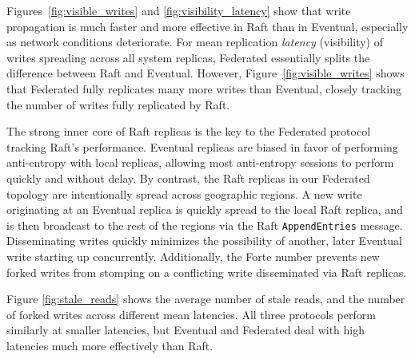 \documentclass[10pt,conference,letterpaper]{IEEEtran}
\newcommand{\todo}[1]{{\textcolor{red}{#1}}}
\newcommand{\pjk}[1]{[\todo{PJK: #1}]}
\begin{document}

Figures~\ref{fig:visible_writes} and \ref{fig:visibility_latency} show that
write propagation is much faster and more effective in Raft than in Eventual,
especially as network conditions deteriorate.
For mean replication \emph{latency} (visibility) of writes spreading across
all system replicas, Federated essentially splits the difference between Raft
and Eventual.
However, Figure~\ref{fig:visible_writes} shows that Federated fully replicates
many more writes than Eventual, closely tracking the number of writes fully
replicated by Raft.

The strong inner core of Raft replicas is the key to the Federated protocol
tracking Raft's performance.
Eventual replicas are biased in favor of performing anti-entropy with local
replicas, allowing most anti-entropy sessions to perform quickly and without
delay.
By contrast, the Raft replicas in our Federated topology are intentionally
spread across geographic regions.
A new write originating at an Eventual replica is quickly spread to the local
Raft replica, and is then broadcast to the rest of the regions via the Raft
\texttt{AppendEntries} message.
Disseminating writes quickly minimizes the possibility of another, later
Eventual write starting up concurrently.
Additionally, the Forte number prevents new forked writes from stomping on a
conflicting write disseminated via Raft replicas.

Figure \ref{fig:stale_reads} shows the average number of stale reads, and the
number of forked writes across different mean latencies.
All three protocols perform similarly at smaller latencies, but Eventual and
Federated deal with high latencies much more effectively than Raft.
\end{document}
